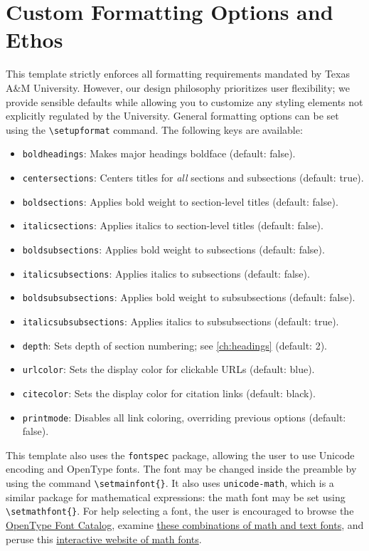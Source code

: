 \section{Custom Formatting Options and Ethos}\label{sec:customize}
This template strictly enforces all formatting requirements mandated by Texas A\&M University.
However, our design philosophy prioritizes user flexibility; we provide sensible defaults while allowing you to customize any styling elements not explicitly regulated by the University.
General formatting options can be set using the \verb|\setupformat| command.
The following keys are available:
\begin{itemize}
  \item \texttt{boldheadings}: Makes major headings boldface (default: false).
  \item \texttt{centersections}: Centers titles for \textit{all} sections and subsections (default: true).
  \item \texttt{boldsections}: Applies bold weight to section-level titles (default: false).
  \item \texttt{italicsections}: Applies italics to section-level titles (default: false).
  \item \texttt{boldsubsections}: Applies bold weight to subsections (default: false).
  \item \texttt{italicsubsections}: Applies italics to subsections (default: false).
  \item \texttt{boldsubsubsections}: Applies bold weight to subsubsections (default: false).
  \item \texttt{italicsubsubsections}: Applies italics to subsubsections (default: true).
  \item \texttt{depth}: Sets depth of section numbering; see \autoref{ch:headings} (default: 2).
  \item \texttt{urlcolor}: Sets the display color for clickable URLs (default: blue).
  \item \texttt{citecolor}: Sets the display color for citation links (default: black).
  \item \texttt{printmode}: Disables all link coloring, overriding previous options (default: false).
\end{itemize}
This template also uses the \texttt{fontspec} package, allowing the user to use Unicode encoding and OpenType fonts.
The font may be changed inside the preamble by using the command \verb|\setmainfont{}|.
It also uses \texttt{unicode-math}, which is a similar package for mathematical expressions: the math font may be set using \verb|\setmathfont{}|.
For help selecting a font, the user is encouraged to browse the
\href{https://www.tug.org/FontCatalogue/opentypefonts.html}{OpenType Font Catalog}, examine
\href{https://tex.stackexchange.com/a/425099/433960}{these combinations of math and text fonts}, and peruse this
\href{https://fred-wang.github.io/MathFonts/}{interactive website of math fonts}.

